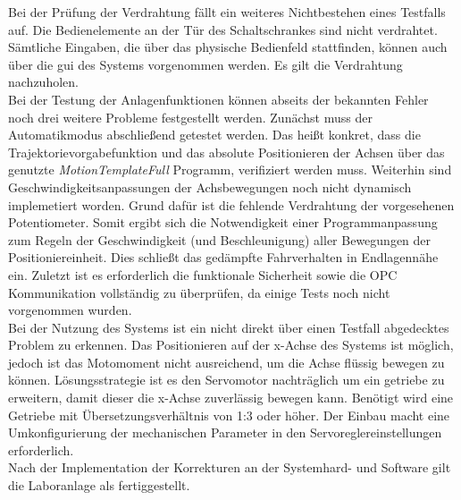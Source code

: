 \documentclass[../../../Bachelorarbeit.tex]{subfiles}
\begin{document}
Bei der Prüfung der Verdrahtung fällt ein weiteres Nichtbestehen eines Testfalls auf. Die Bedienelemente an der Tür des Schaltschrankes sind nicht verdrahtet. Sämtliche Eingaben, die über das physische Bedienfeld stattfinden, können auch über die \acs{gui} des Systems vorgenommen werden. Es gilt die Verdrahtung nachzuholen.\\
Bei der Testung der Anlagenfunktionen können abseits der bekannten Fehler noch drei weitere Probleme festgestellt werden. Zunächst muss der Automatikmodus abschließend getestet werden. Das heißt konkret, dass die Trajektorievorgabefunktion und das absolute Positionieren der Achsen über das genutzte \textit{MotionTemplateFull} Programm, verifiziert werden muss. Weiterhin sind Geschwindigkeitsanpassungen der Achsbewegungen noch nicht dynamisch implemetiert worden. Grund dafür ist die fehlende Verdrahtung der vorgesehenen Potentiometer. Somit ergibt sich die Notwendigkeit einer Programmanpassung zum Regeln der Geschwindigkeit (und Beschleunigung) aller Bewegungen der Positioniereinheit. Dies schließt das gedämpfte Fahrverhalten in Endlagennähe ein. Zuletzt ist es erforderlich die funktionale Sicherheit sowie die OPC Kommunikation vollständig zu überprüfen, da einige Tests noch nicht vorgenommen wurden.\\
Bei der Nutzung des Systems ist ein nicht direkt über einen Testfall abgedecktes Problem zu erkennen. Das Positionieren auf der x-Achse des Systems ist möglich, jedoch ist das Motomoment nicht ausreichend, um die Achse flüssig bewegen zu können. Lösungsstrategie ist es den Servomotor nachträglich um ein getriebe zu erweitern, damit dieser die x-Achse zuverlässig bewegen kann. Benötigt wird eine Getriebe mit Übersetzungsverhältnis von 1:3 oder höher. Der Einbau macht eine Umkonfigurierung der mechanischen Parameter in den Servoreglereinstellungen erforderlich.\\
\bigskip \newline
Nach der Implementation der Korrekturen an der Systemhard- und Software gilt die Laboranlage als fertiggestellt. 
\end{document}
